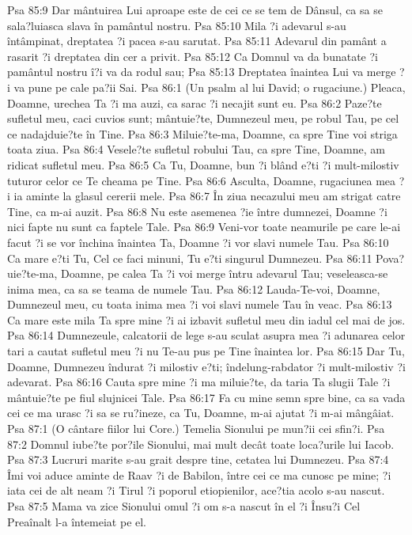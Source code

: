 Psa 85:9  Dar mântuirea Lui aproape este de cei ce se tem de Dânsul, ca sa se sala?luiasca slava în pamântul nostru.
Psa 85:10  Mila ?i adevarul s-au întâmpinat, dreptatea ?i pacea s-au sarutat.
Psa 85:11  Adevarul din pamânt a rasarit ?i dreptatea din cer a privit.
Psa 85:12  Ca Domnul va da bunatate ?i pamântul nostru î?i va da rodul sau;
Psa 85:13  Dreptatea înaintea Lui va merge ?i va pune pe cale pa?ii Sai.
Psa 86:1  (Un psalm al lui David; o rugaciune.) Pleaca, Doamne, urechea Ta ?i ma auzi, ca sarac ?i necajit sunt eu.
Psa 86:2  Paze?te sufletul meu, caci cuvios sunt; mântuie?te, Dumnezeul meu, pe robul Tau, pe cel ce nadajduie?te în Tine.
Psa 86:3  Miluie?te-ma, Doamne, ca spre Tine voi striga toata ziua.
Psa 86:4  Vesele?te sufletul robului Tau, ca spre Tine, Doamne, am ridicat sufletul meu.
Psa 86:5  Ca Tu, Doamne, bun ?i blând e?ti ?i mult-milostiv tuturor celor ce Te cheama pe Tine.
Psa 86:6  Asculta, Doamne, rugaciunea mea ?i ia aminte la glasul cererii mele.
Psa 86:7  În ziua necazului meu am strigat catre Tine, ca m-ai auzit.
Psa 86:8  Nu este asemenea ?ie între dumnezei, Doamne ?i nici fapte nu sunt ca faptele Tale.
Psa 86:9  Veni-vor toate neamurile pe care le-ai facut ?i se vor închina înaintea Ta, Doamne ?i vor slavi numele Tau.
Psa 86:10  Ca mare e?ti Tu, Cel ce faci minuni, Tu e?ti singurul Dumnezeu.
Psa 86:11  Pova?uie?te-ma, Doamne, pe calea Ta ?i voi merge întru adevarul Tau; veseleasca-se inima mea, ca sa se teama de numele Tau.
Psa 86:12  Lauda-Te-voi, Doamne, Dumnezeul meu, cu toata inima mea ?i voi slavi numele Tau în veac.
Psa 86:13  Ca mare este mila Ta spre mine ?i ai izbavit sufletul meu din iadul cel mai de jos.
Psa 86:14  Dumnezeule, calcatorii de lege s-au sculat asupra mea ?i adunarea celor tari a cautat sufletul meu ?i nu Te-au pus pe Tine înaintea lor.
Psa 86:15  Dar Tu, Doamne, Dumnezeu îndurat ?i milostiv e?ti; îndelung-rabdator ?i mult-milostiv ?i adevarat.
Psa 86:16  Cauta spre mine ?i ma miluie?te, da taria Ta slugii Tale ?i mântuie?te pe fiul slujnicei Tale.
Psa 86:17  Fa cu mine semn spre bine, ca sa vada cei ce ma urasc ?i sa se ru?ineze, ca Tu, Doamne, m-ai ajutat ?i m-ai mângâiat.
Psa 87:1  (O cântare fiilor lui Core.) Temelia Sionului pe mun?ii cei sfin?i.
Psa 87:2  Domnul iube?te por?ile Sionului, mai mult decât toate loca?urile lui Iacob.
Psa 87:3  Lucruri marite s-au grait despre tine, cetatea lui Dumnezeu.
Psa 87:4  Îmi voi aduce aminte de Raav ?i de Babilon, între cei ce ma cunosc pe mine; ?i iata cei de alt neam ?i Tirul ?i poporul etiopienilor, ace?tia acolo s-au nascut.
Psa 87:5  Mama va zice Sionului omul ?i om s-a nascut în el ?i Însu?i Cel Preaînalt l-a întemeiat pe el.
